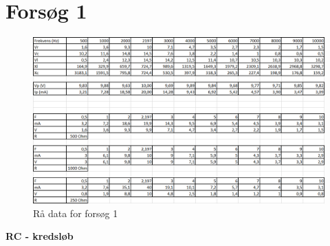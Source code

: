 \chapter{Forsøg 1} \label{bilag:forsg1}

\begin{figure}[H]
\centering
\includegraphics[width=1\textwidth]{Setup/Bilag_forsg1}
\caption{Rå data for forsøg 1}
\label{tabular:forsg1}
\end{figure}

\textbf{RC - kredsløb}


